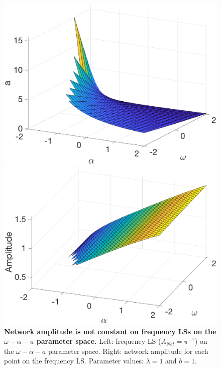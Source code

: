 \begin{figure}[h]
\centering
  \begin{minipage}{0.45\linewidth}
  \centering
    \includegraphics[width=1\linewidth]{Images/photo13_1.eps} 
  \end{minipage} 
  \begin{minipage}{0.45\linewidth}
  \centering
    \includegraphics[width=1\linewidth]{Images/photo13_2.eps} 
  \end{minipage} 
 
 \caption{\textbf{Network amplitude is not constant on frequency LSs on the $\omega-\alpha-a$ parameter space.} Left: frequency LS ($A_{Net} = \pi^{-1}$) on the $\omega-\alpha-a$ parameter space. Right: network amplitude for each point on the frequency LS. Parameter values: $\lambda= 1$ and $b = 1$.}
  \label{photo13}
\end{figure}

